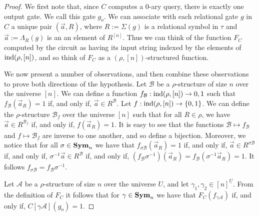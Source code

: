 \documentclass[../paper.tex]{subfiles}
\begin{document}
\begin{proof}
  We first note that, since $C$ computes a $0$-ary query, there is exactly one
  output gate. We call this gate $g_o$. We can associate with each relational
  gate $g$ in $C$ a unique pair $(\vec{a}, R)$, where $R := \Sigma (g)$ is a
  relational symbol in $\tau$ and $\vec{a} := \Lambda_R(g)$ is an an element of
  $R^{[n]}$. Thus we can think of the function $F_C$ computed by the circuit as
  having its input string indexed by the elements of $\text{\upshape ind}(\rho, [n])$, and so
  think of $F_C$ as a $(\rho, [n])$-structured function.


  We now present a number of observations, and then combine these observations
  to prove both directions of the hypothesis. Let $\mathcal{B}$ be a
  $\rho$-structure of size $n$ over the universe $[n]$. We can define a function
  $f_{\mathcal{B}} : \text{\upshape ind}(\rho, [n]) \rightarrow {0,1}$ such that
  $f_{\mathcal{B}} (\vec{a}_R) = 1$ if, and only if, $\vec{a} \in
  R^{\mathcal{B}}$. Let $f : \text{\upshape ind}(\rho, [n]) \rightarrow \{0,1\}$. We can define
  the $\rho$-structure $\mathcal{B}_f$ over the universe $[n]$ such that for all
  $R \in \rho$, we have $\vec{a} \in R^{\mathcal{B}_f}$ if, and only if,
  $f(\vec{a}_R) = 1$. It is easy to see that the functions $\mathcal{B} \mapsto
  f_{\mathcal{B}}$ and $f \mapsto \mathcal{B}_f$ are inverse to one another, and
  so define a bijection. Moreover, we notice that for all $\sigma \in \text{\textbf{Sym}}_n$ we
  have that $f_{\sigma \mathcal{B}}(\vec{a}_R) = 1$ if, and only if, $\vec{a}
  \in R^{\sigma \mathcal{B}}$ if, and only if, $\sigma^{-1} \vec{a} \in
  R^{\mathcal{B}}$ if, and only if, $(f_{\mathcal{B}} \sigma^{-1})(\vec{a}_R) =
  f_{\mathcal{B}}(\sigma^{-1} \vec{a}_R)= 1$. It follows $f_{\sigma \mathcal{B}}
  = f_{\mathcal{B}} \sigma^{-1}$.

  Let $\mathcal{A}$ be a $\rho$-structure of size $n$ over the universe $U$, and
  let $\gamma_1, \gamma_2 \in [n]^{\underline{U}}$. From the definition of $F_C$
  it follows that for $\gamma \in \text{\textbf{Sym}}_n$ we have that $F_C (f_{\gamma
    \mathcal{A}})$ if, and only if, $C[\gamma \mathcal{A}](g_{\text{o}}) = 1$.


\end{proof}
\end{document}
